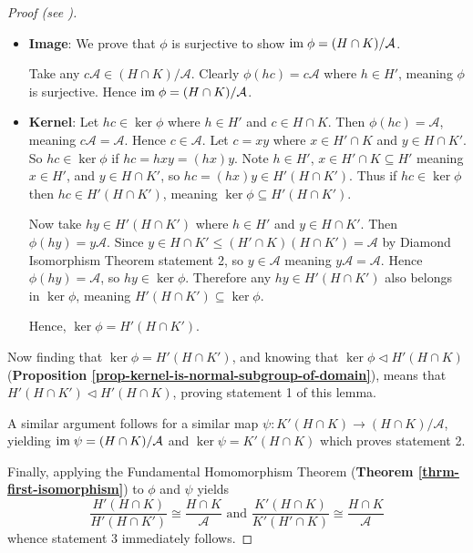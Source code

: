 \begin{proof}[Proof (see {\cite[p.~110]{hungerford_1980}})]
\begin{itemize}
        \item \textbf{Image}: We prove that $\phi$ is surjective to show $\mathrm{im}\; \phi = (H\cap K)/\mathcal{A}$.
        
        Take any $c\mathcal{A} \in (H\cap K) / \mathcal{A}$. Clearly $\phi(hc) = c\mathcal{A}$ where $h \in H'$, meaning $\phi$ is surjective. Hence $\mathrm{im}\; \phi = (H\cap K)/\mathcal{A}$.
        
        \item \textbf{Kernel}: Let $hc \in \ker\phi$ where $h \in H'$ and $c \in H \cap K$. Then $\phi(hc) = \mathcal{A}$, meaning $c\mathcal{A} = \mathcal{A}$. Hence $c \in \mathcal{A}$. Let $c = xy$ where $x \in H'\cap K$ and $y \in H \cap K'$. So $hc \in \ker\phi$ if $hc = hxy = (hx)y$. Note $h \in H'$, $x \in H' \cap K \subseteq H'$ meaning $x \in H'$, and $y \in H \cap K'$, so $hc = (hx)y \in H'(H \cap K')$. Thus if $hc \in \ker\phi$ then $hc \in H'(H \cap K')$, meaning $\ker\phi \subseteq H'(H \cap K')$.
        
        Now take $hy \in H'(H \cap K')$ where $h \in H'$ and $y \in H \cap K'$. Then $\phi(hy) = y\mathcal{A}$. Since $y \in H \cap K' \leq (H' \cap K)(H \cap K') = \mathcal{A}$ by Diamond Isomorphism Theorem statement 2, so $y \in \mathcal{A}$ meaning $y\mathcal{A} = \mathcal{A}$. Hence $\phi(hy) = \mathcal{A}$, so $hy \in \ker\phi$. Therefore any $hy \in H'(H \cap K')$ also belongs in $\ker\phi$, meaning $H'(H \cap K') \subseteq \ker\phi$.
        
        Hence, $\ker\phi = H'(H \cap K')$.
    \end{itemize}
    
    Now finding that $\ker\phi = H'(H \cap K')$, and knowing that $\ker\phi \lhd H'(H\cap K)$ (\textbf{Proposition \ref{prop-kernel-is-normal-subgroup-of-domain}}), means that $H'(H \cap K') \lhd H'(H\cap K)$, proving statement 1 of this lemma.
    
    A similar argument follows for a similar map $\psi: K'(H\cap K) \to (H\cap K)/\mathcal{A}$, yielding $\mathrm{im}\;\psi = (H\cap K)/\mathcal{A}$ and $\ker\psi = K'(H\cap K)$ which proves statement 2.
    
    Finally, applying the Fundamental Homomorphism Theorem (\textbf{Theorem \ref{thrm-first-isomorphism}}) to $\phi$ and $\psi$ yields
    \[
        \frac{H'(H\cap K)}{H'(H\cap K')} \cong \frac{H\cap K}{\mathcal{A}} \text{ and } \frac{K'(H\cap K)}{K'(H'\cap K)} \cong \frac{H\cap K}{\mathcal{A}}
    \]
    whence statement 3 immediately follows.
\end{proof}

